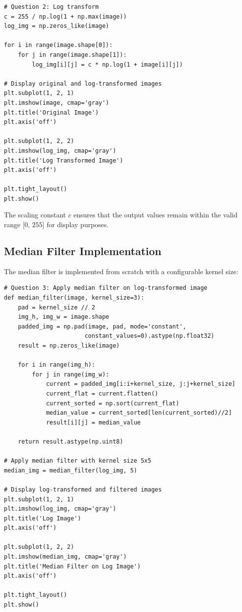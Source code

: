 \documentclass[12pt,a4paper]{article}
\begin{document}
\begin{lstlisting}[caption={Log Transformation Implementation}]
# Question 2: Log transform
c = 255 / np.log(1 + np.max(image))
log_img = np.zeros_like(image)

for i in range(image.shape[0]):
    for j in range(image.shape[1]):
        log_img[i][j] = c * np.log(1 + image[i][j])

# Display original and log-transformed images
plt.subplot(1, 2, 1)
plt.imshow(image, cmap='gray')
plt.title('Original Image')
plt.axis('off')

plt.subplot(1, 2, 2)
plt.imshow(log_img, cmap='gray')
plt.title('Log Transformed Image')
plt.axis('off')

plt.tight_layout()
plt.show()
\end{lstlisting}

The scaling constant $c$ ensures that the output values remain within the valid range [0, 255] for display purposes.

\subsection{Median Filter Implementation}
The median filter is implemented from scratch with a configurable kernel size:

\begin{lstlisting}[caption={Median Filter Implementation}]
# Question 3: Apply median filter on log-transformed image
def median_filter(image, kernel_size=3):
    pad = kernel_size // 2
    img_h, img_w = image.shape
    padded_img = np.pad(image, pad, mode='constant', 
                       constant_values=0).astype(np.float32)
    result = np.zeros_like(image)
    
    for i in range(img_h):
        for j in range(img_w):
            current = padded_img[i:i+kernel_size, j:j+kernel_size]
            current_flat = current.flatten()
            current_sorted = np.sort(current_flat)
            median_value = current_sorted[len(current_sorted)//2]
            result[i][j] = median_value
    
    return result.astype(np.uint8)

# Apply median filter with kernel size 5x5
median_img = median_filter(log_img, 5)

# Display log-transformed and filtered images
plt.subplot(1, 2, 1)
plt.imshow(log_img, cmap='gray')
plt.title('Log Image')
plt.axis('off')

plt.subplot(1, 2, 2)
plt.imshow(median_img, cmap='gray')
plt.title('Median Filter on Log Image')
plt.axis('off')

plt.tight_layout()
plt.show()
\end{lstlisting}
\end{document}
